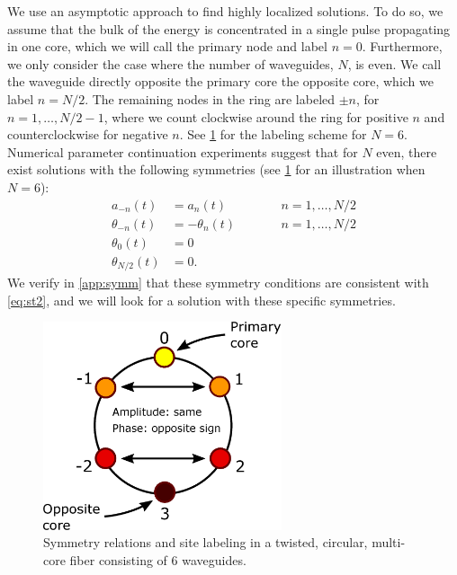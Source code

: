 \documentclass[11pt,reqno]{amsart}
\begin{document}
We use an asymptotic approach to find highly localized solutions. To do so, we assume that the bulk of the energy is concentrated in a single pulse propagating in one core, which we will call the primary node and label $n=0$. Furthermore, we only consider the case where  the number of waveguides, $N$, is even. We call the waveguide directly opposite the primary core the opposite core, which we label $n=N/2$. The remaining nodes in the ring are labeled $\pm n$, for $n = 1, \dots, N/2-1$, where we count clockwise around the ring for positive $n$ and counterclockwise for negative $n$. See \cref{fig:symm6} for the labeling scheme for $N=6$. Numerical parameter continuation experiments suggest that for $N$ even, there exist solutions with the following symmetries (see \cref{fig:symm6} for an illustration when $N=6$):
\begin{equation}\label{eq:symm}
\begin{aligned}
a_{-n}(t) &= a_{n}(t) && \qquad n = 1, \dots, N/2 \\
\theta_{-n}(t) &= -\theta_{n}(t) && \qquad n = 1, \dots, N/2 \\
\theta_0(t) &= 0 \\
\theta_{N/2}(t) &= 0.
\end{aligned}
\end{equation} 
We verify in \cref{app:symm} that these symmetry conditions are consistent with \cref{eq:st2}, and we will look for a solution with these specific symmetries. 

\begin{figure}
\begin{center}
\includegraphics[width=7cm]{symm6}
\end{center}
\caption{Symmetry relations and site labeling in a twisted, circular, multi-core fiber consisting of 6 waveguides.}
\label{fig:symm6}
\end{figure}
\end{document}
